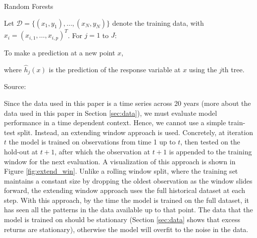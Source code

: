 \begin{algorithm}[H]
    \caption{Random Forests}
    \label{alg:random_forests}
    
    Let $\mathcal{D} = \{(x_1, y_1), \ldots, (x_N, y_N)\}$ denote the training data, with $x_i = (x_{i,1}, \ldots, x_{i,p})^T$. For $j = 1$ to $J$:
    
    
    To make a prediction at a new point $x$,
    
    where $\widehat{h}_j(x)$ is the prediction of the response variable at $x$ using the $j$th tree.

    Source: \cite{cutler_2012}
\end{algorithm}

Since the data used in this paper is a time series across 20 years (more about the data used in this paper in Section \ref{sec:data}), we must evaluate model performance in a time dependent context. Hence, we cannot use a simple train-test split. Instead, an extending window approach is used. Concretely, at iteration $t$ the model is trained on observations from time 1 up to $t$, then tested on the hold-out at $t+1$, after which the observation at $t+1$ is appended to the training window for the next evaluation. A visualization of this approach is shown in Figure \ref{fig:extend_win}. Unlike a rolling window split, where the training set maintains a constant size by dropping the oldest observation as the window slides forward, the extending window approach uses the full historical dataset at each step. With this approach, by the time the model is trained on the full dataset, it has seen all the patterns in the data available up to that point. The data that the model is trained on should be stationary (Section \ref{sec:data} shows that excess returns are stationary), otherwise the model will overfit to the noise in the data.

